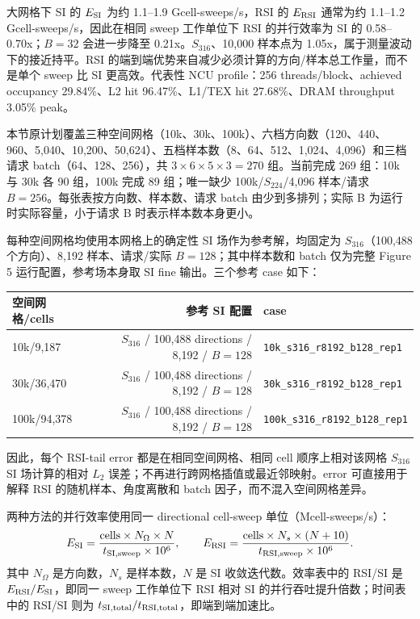 \documentclass[10pt]{article}
\newcommand{\subsect}[1]{\vspace{2mm}{\sffamily\large\bfseries #1}\par}
\newcommand{\code}[1]{\texttt{#1}}
\begin{document}
大网格下 SI 的 $E_{\rm SI}$ 为约 1.1--1.9 Gcell-sweeps/s，RSI 的 $E_{\rm RSI}$ 通常为约 1.1--1.2 Gcell-sweeps/s，因此在相同 sweep 工作单位下 RSI 的并行效率为 SI 的 0.58--0.70x；$B=32$ 会进一步降至 0.21x。$S_{316}$、10,000 样本点为 1.05x，属于测量波动下的接近持平。RSI 的端到端优势来自减少必须计算的方向/样本总工作量，而不是单个 sweep 比 SI 更高效。代表性 NCU profile：256 threads/block、achieved occupancy 29.84\%、L2 hit 96.47\%、L1/TEX hit 27.68\%、DRAM throughput 3.05\% peak。

\subsect{8.4 网格、角度、样本与 batch 因子的 270 组测试}

本节原计划覆盖三种空间网格（10k、30k、100k）、六档方向数（120、440、960、5,040、10,200、50,624）、五档样本数（8、64、512、1,024、4,096）和三档请求 batch（64、128、256），共 $3\times6\times5\times3=270$ 组。当前完成 269 组：10k 与 30k 各 90 组，100k 完成 89 组；唯一缺少 100k/$S_{224}$/4,096 样本/请求 $B=256$。每张表按方向数、样本数、请求 batch 由少到多排列；实际 B 为运行时实际容量，小于请求 B 时表示样本数本身更小。

每种空间网格均使用本网格上的确定性 SI 场作为参考解，均固定为 $S_{316}$（100,488 个方向）、8,192 样本、请求/实际 $B=128$；其中样本数和 batch 仅为完整 Figure 5 运行配置，参考场本身取 SI fine 输出。三个参考 case 如下：

{\scriptsize\setlength{\tabcolsep}{4pt}
\begin{tabular}{lrl}
\toprule
空间网格/cells & 参考 SI 配置 & case\\
\midrule
10k/9,187 & $S_{316}$ / 100,488 directions / 8,192 / $B=128$ & \code{10k\_s316\_r8192\_b128\_rep1}\\
30k/36,470 & $S_{316}$ / 100,488 directions / 8,192 / $B=128$ & \code{30k\_s316\_r8192\_b128\_rep1}\\
100k/94,378 & $S_{316}$ / 100,488 directions / 8,192 / $B=128$ & \code{100k\_s316\_r8192\_b128\_rep1}\\
\bottomrule
\end{tabular}}

因此，每个 RSI-tail error 都是在相同空间网格、相同 cell 顺序上相对该网格 $S_{316}$ SI 场计算的相对 $L_2$ 误差；不再进行跨网格插值或最近邻映射。error 可直接用于解释 RSI 的随机样本、角度离散和 batch 因子，而不混入空间网格差异。

两种方法的并行效率使用同一 directional cell-sweep 单位（Mcell-sweeps/s）：
\[
E_{\rm SI}=\frac{\mathrm{cells}\times N_{\Omega}\times N}{t_{\rm SI,sweep}\times10^6},\qquad
E_{\rm RSI}=\frac{\mathrm{cells}\times N_s\times(N+10)}{t_{\rm RSI,sweep}\times10^6}.
\]
其中 $N_{\Omega}$ 是方向数，$N_s$ 是样本数，$N$ 是 SI 收敛迭代数。效率表中的 RSI/SI 是 $E_{\rm RSI}/E_{\rm SI}$，即同一 sweep 工作单位下 RSI 相对 SI 的并行吞吐提升倍数；时间表中的 RSI/SI 则为 $t_{\rm SI,total}/t_{\rm RSI,total}$，即端到端加速比。
\end{document}
